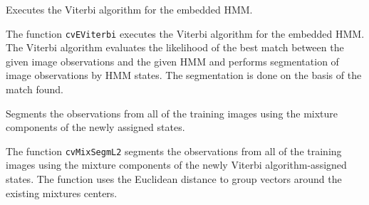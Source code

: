 
Executes the Viterbi algorithm for the embedded HMM.


\begin{description}
\end{description}

The function \texttt{cvEViterbi} executes the Viterbi algorithm for the embedded HMM. The Viterbi algorithm evaluates the likelihood of the best match between the given image observations and the given HMM and performs segmentation of image observations by HMM states. The segmentation is done on the basis of the match found.


Segments the observations from all of the training images using the mixture components of the newly assigned states.


\begin{description}
\end{description}

The function \texttt{cvMixSegmL2} segments the observations from all of the training images using the mixture components of the newly Viterbi algorithm-assigned states. The function uses the Euclidean distance to group vectors around the existing mixtures centers.

\fi
